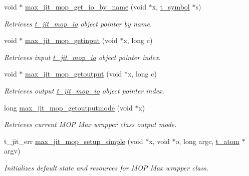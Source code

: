 \begin{DoxyCompactItemize}
void $\ast$ \hyperlink{group__maxmopmod_gac9b7b486107f75f0d01fe82b34a5a6ea}{max\_\-jit\_\-mop\_\-get\_\-io\_\-by\_\-name} (void $\ast$x, \hyperlink{structt__symbol}{t\_\-symbol} $\ast$s)
\begin{DoxyCompactList}\small\item\em Retrieves \hyperlink{structt__jit__mop__io}{t\_\-jit\_\-mop\_\-io} object pointer by name. \item\end{DoxyCompactList}\item 
void $\ast$ \hyperlink{group__maxmopmod_ga92d7b66952db7f2b4045cfa51924c69d}{max\_\-jit\_\-mop\_\-getinput} (void $\ast$x, long c)
\begin{DoxyCompactList}\small\item\em Retrieves input \hyperlink{structt__jit__mop__io}{t\_\-jit\_\-mop\_\-io} object pointer index. \item\end{DoxyCompactList}\item 
void $\ast$ \hyperlink{group__maxmopmod_ga4cc6070d8e9d74882ecfbeb7b244266f}{max\_\-jit\_\-mop\_\-getoutput} (void $\ast$x, long c)
\begin{DoxyCompactList}\small\item\em Retrieves output \hyperlink{structt__jit__mop__io}{t\_\-jit\_\-mop\_\-io} object pointer index. \item\end{DoxyCompactList}\item 
long \hyperlink{group__maxmopmod_gad8eb4eab73dc45290345b80f7ec31ec3}{max\_\-jit\_\-mop\_\-getoutputmode} (void $\ast$x)
\begin{DoxyCompactList}\small\item\em Retrieves current MOP Max wrapper class output mode. \item\end{DoxyCompactList}\item 
t\_\-jit\_\-err \hyperlink{group__maxmopmod_gac3eaca207281516b72e81f0dc5f4bf94}{max\_\-jit\_\-mop\_\-setup\_\-simple} (void $\ast$x, void $\ast$o, long argc, \hyperlink{structt__atom}{t\_\-atom} $\ast$argv)
\begin{DoxyCompactList}\small\item\em Initializes default state and resources for MOP Max wrapper class. \item\end{DoxyCompactList}\end{DoxyCompactItemize}


